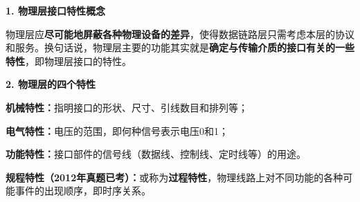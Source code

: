 {\textbf{1. 物理层接口特性概念}}

{物理层应\textbf{{尽可能地屏蔽各种物理设备的差异}}，使得数据链路层只需考虑本层的协议和服务。换句话说，物理层主要的功能其实就是\textbf{{确定与传输介质的接口有关的一些特性}}，即物理层接口的特性。}

{\textbf{2. 物理层的四个特性}}{\textbf{}}

\textbf{机械特性：}指明接口的形状、尺寸、引线数目和排列等；

\textbf{电气特性：}电压的范围，即何种信号表示电压0和1；

\textbf{功能特性：}接口部件的信号线（数据线、控制线、定时线等）的用途。

\textbf{规程特性（2012年真题已考）：}或称为{\textbf{过程特性}}{，物理线路上对不同功能的各种可能事件的出现顺序，即时序关系。}
